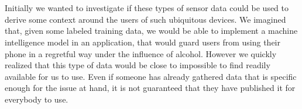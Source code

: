 \\\\
Initially we wanted to investigate if these types of sensor data could be used to derive some context around the users of such ubiquitous devices. We imagined that, given some labeled training data, we would be able to implement a machine intelligence model in an application, that would guard users from using their phone in a regretful way under the influence of alcohol. However we quickly realized that this type of data would be close to impossible to find readily available for us to use. Even if someone has already gathered data that is specific enough for the issue at hand, it is not guaranteed that they have published it for everybody to use.